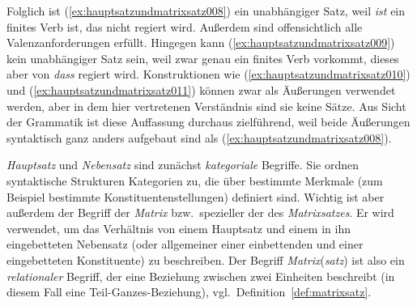 
Folglich ist (\ref{ex:hauptsatzundmatrixsatz008}) ein unabhängiger Satz, weil \textit{ist} ein finites Verb ist, das nicht regiert wird.
Außerdem sind offensichtlich alle Valenzanforderungen erfüllt.
Hingegen kann (\ref{ex:hauptsatzundmatrixsatz009}) kein unabhängiger Satz sein, weil zwar genau ein finites Verb vorkommt, dieses aber von \textit{dass} regiert wird.
Konstruktionen wie (\ref{ex:hauptsatzundmatrixsatz010}) und (\ref{ex:hauptsatzundmatrixsatz011}) können zwar als Äußerungen verwendet werden, aber in dem hier vertretenen Verständnis sind sie keine Sätze.
Aus Sicht der Grammatik ist diese Auffassung durchaus zielführend, weil beide Äußerungen syntaktisch ganz anders aufgebaut sind als (\ref{ex:hauptsatzundmatrixsatz008}).

\begin{exe}
  \ex\label{ex:hauptsatzundmatrixsatz007}
  \begin{xlist}
  \end{xlist}
\end{exe}

\textit{Hauptsatz} und \textit{Nebensatz} sind zunächst \textit{kategoriale} Begriffe.
Sie ordnen syntaktische Strukturen Kategorien zu, die über bestimmte Merkmale (zum Beispiel bestimmte Konstituentenstellungen) definiert sind.
Wichtig ist aber außerdem der Begriff der \textit{Matrix} bzw.\ spezieller der des \textit{Matrixsatzes}.
Er wird verwendet, um das Verhältnis von einem Hauptsatz und einem in ihn eingebetteten Nebensatz (oder allgemeiner einer einbettenden und einer eingebetteten Konstituente) zu beschreiben.
Der Begriff \textit{Matrix}(\textit{satz}) ist also ein \textit{relationaler} Begriff, der eine Beziehung zwischen zwei Einheiten beschreibt (in diesem Fall eine Teil-Ganzes-Beziehung), vgl.\ Definition~\ref{def:matrixsatz}.


